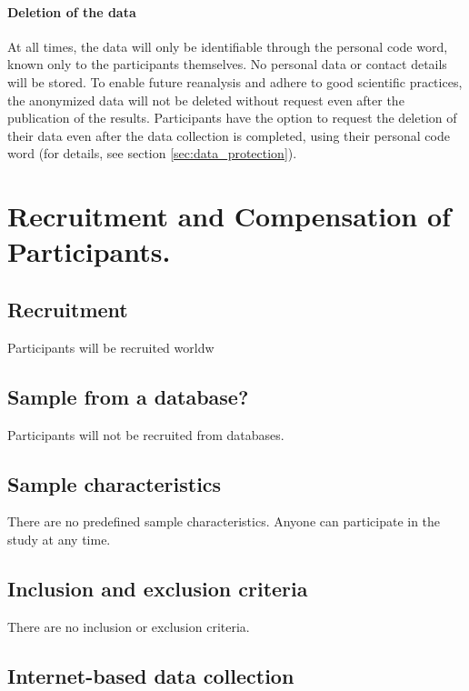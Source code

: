 \documentclass[11pt,twoside,a4paper]{article}
\begin{document}
\paragraph{Deletion of the data} 


At all times, the data will only be identifiable through the personal code word, known only to the participants themselves.
No personal data or contact details will be stored.
To enable future reanalysis and adhere to good scientific practices, the anonymized data will not be deleted without request even after the publication of the results.
Participants have the option to request the deletion of their data even after the data collection is completed, using their personal code word (for details, see section \ref{sec:data_protection}).

\section{Recruitment and Compensation of Participants.}

\subsection{Recruitment}

Participants will be recruited worldw

\subsection{Sample from a database?}

Participants will not be recruited from databases.

\subsection{Sample characteristics}

There are no predefined sample characteristics.
Anyone can participate in the study at any time.

\subsection{Inclusion and exclusion criteria}

There are no inclusion or exclusion criteria.

\subsection{Internet-based data collection}
\end{document}
